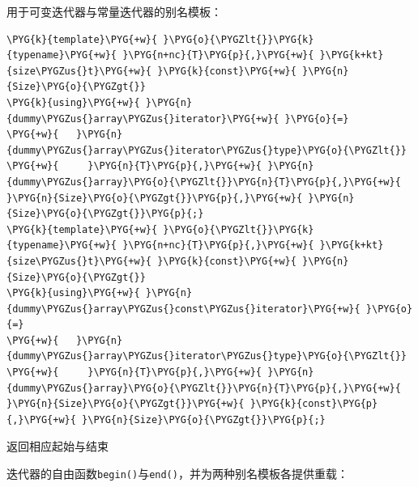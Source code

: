 
用于可变迭代器与常量迭代器的别名模板：



\begin{codeblockbg}
\begin{Verbatim}[commandchars=\\\{\},breaklines=true,breakanywhere=true,fontsize=\codefont,xleftmargin=17bp]
\PYG{k}{template}\PYG{+w}{ }\PYG{o}{\PYGZlt{}}\PYG{k}{typename}\PYG{+w}{ }\PYG{n+nc}{T}\PYG{p}{,}\PYG{+w}{ }\PYG{k+kt}{size\PYGZus{}t}\PYG{+w}{ }\PYG{k}{const}\PYG{+w}{ }\PYG{n}{Size}\PYG{o}{\PYGZgt{}}
\PYG{k}{using}\PYG{+w}{ }\PYG{n}{dummy\PYGZus{}array\PYGZus{}iterator}\PYG{+w}{ }\PYG{o}{=}
\PYG{+w}{   }\PYG{n}{dummy\PYGZus{}array\PYGZus{}iterator\PYGZus{}type}\PYG{o}{\PYGZlt{}}
\PYG{+w}{     }\PYG{n}{T}\PYG{p}{,}\PYG{+w}{ }\PYG{n}{dummy\PYGZus{}array}\PYG{o}{\PYGZlt{}}\PYG{n}{T}\PYG{p}{,}\PYG{+w}{ }\PYG{n}{Size}\PYG{o}{\PYGZgt{}}\PYG{p}{,}\PYG{+w}{ }\PYG{n}{Size}\PYG{o}{\PYGZgt{}}\PYG{p}{;}
\PYG{k}{template}\PYG{+w}{ }\PYG{o}{\PYGZlt{}}\PYG{k}{typename}\PYG{+w}{ }\PYG{n+nc}{T}\PYG{p}{,}\PYG{+w}{ }\PYG{k+kt}{size\PYGZus{}t}\PYG{+w}{ }\PYG{k}{const}\PYG{+w}{ }\PYG{n}{Size}\PYG{o}{\PYGZgt{}}
\PYG{k}{using}\PYG{+w}{ }\PYG{n}{dummy\PYGZus{}array\PYGZus{}const\PYGZus{}iterator}\PYG{+w}{ }\PYG{o}{=}
\PYG{+w}{   }\PYG{n}{dummy\PYGZus{}array\PYGZus{}iterator\PYGZus{}type}\PYG{o}{\PYGZlt{}}
\PYG{+w}{     }\PYG{n}{T}\PYG{p}{,}\PYG{+w}{ }\PYG{n}{dummy\PYGZus{}array}\PYG{o}{\PYGZlt{}}\PYG{n}{T}\PYG{p}{,}\PYG{+w}{ }\PYG{n}{Size}\PYG{o}{\PYGZgt{}}\PYG{+w}{ }\PYG{k}{const}\PYG{p}{,}\PYG{+w}{ }\PYG{n}{Size}\PYG{o}{\PYGZgt{}}\PYG{p}{;}
\end{Verbatim}
\end{codeblockbg}



返回相应起始与结束



迭代器的自由函数\texttt{begin()}与\texttt{end()}，并为两种别名模板各提供重载：



